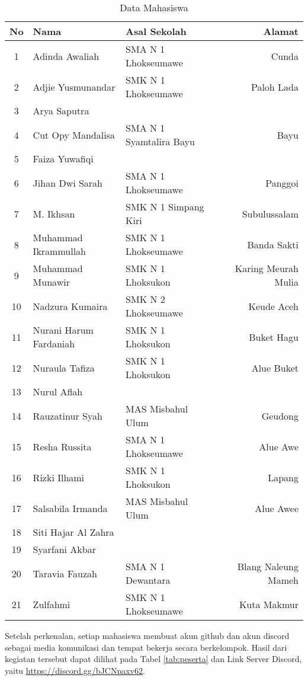 \documentclass[a4paper]{tufte-handout}
\begin{document}
\begin{table}[!ht]
\vspace*{.5cm}
\caption{Data Mahasiswa}
\label{tab:perkenalan}
\centering
\begin{tabular}{cllr} 
\toprule
No & Nama 				& Asal Sekolah 				& Alamat\\
\midrule
1 	& Adinda Awaliah	& SMA N 1 Lhokseumawe 		& Cunda \\
2 	& Adjie Yusmunandar	& SMK N 1 Lhokseumawe 		& Paloh Lada \\
3 	& Arya Saputra		& & \\
4 	& Cut Opy Mandalisa	& SMA N 1 Syamtalira Bayu	& Bayu \\
5 	& Faiza Yuwafiqi	& & \\
6 	& Jihan Dwi Sarah	& SMA N 1 Lhokseumawe 		& Panggoi \\
7 	& M. Ikhsan			& SMK N 1 Simpang Kiri 		& Subulussalam \\
\midrule
8 	& Muhammad Ikrammullah		& SMK N 1 Lhokseumawe 	& Banda Sakti \\
9 	& Muhammad Munawir			& SMK N 1 Lhoksukon		& Karing Meurah Mulia \\
10 	& Nadzura Kumaira			& SMK N 2 Lhokseumawe 	& Keude Aceh \\
11 	& Nurani Harum Fardaniah	& SMK N 1 Lhoksukon 	& Buket Hagu \\
12 	& Nuraula Tafiza			& SMK N 1 Lhoksukon 	& Alue Buket \\
13 	& Nurul Aflah				& & \\
14 	& Rauzatinur Syah			& MAS Misbahul Ulum 	& Geudong \\
\midrule
15 	& Resha Russita			& SMA N 1 Lhokseumawe 	& Alue Awe \\
16 	& Rizki Ilhami			& SMK N 1 Lhoksukon 	& Lapang \\
17 	& Salsabila Irmanda		& MAS Misbahul Ulum 	& Alue Awee \\
18 	& Siti Hajar Al Zahra	& & \\
19 	& Syarfani Akbar		& & \\
20 	& Taravia Fauzah		& SMA N 1 Dewantara 	& Blang Naleung Mameh \\
21 	& Zulfahmi				& SMK N 1 Lhokseumawe	& Kuta Makmur \\
\bottomrule
\end{tabular}
\end{table}

\vspace*{.5cm}
Setelah perkenalan, setiap mahasiswa membuat akun github dan akun discord sebagai media komunikasi dan tempat bekerja secara berkelompok. Hasil dari kegiatan tersebut dapat dilihat pada Tabel \ref{tab:peserta} dan Link Server Discord, yaitu \url{https://discord.gg/bJCNpaxv62}.
\end{document}
